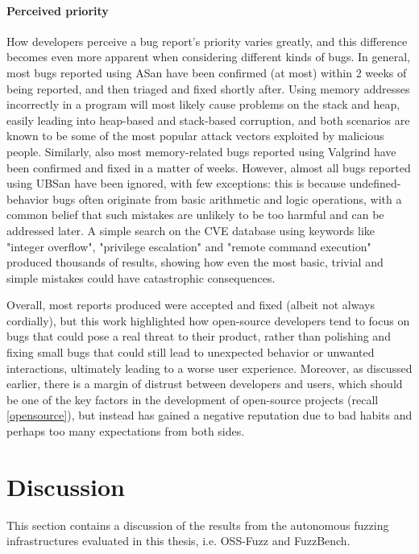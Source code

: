 \paragraph{Perceived priority} How developers perceive a bug report's priority varies greatly, and this difference becomes even more apparent when considering different kinds of bugs. In general, most bugs reported using ASan have been confirmed (at most) within 2 weeks of being reported, and then triaged and fixed shortly after. Using memory addresses incorrectly in a program will most likely cause problems on the stack and heap, easily leading into heap-based and stack-based corruption, and both scenarios are known to be some of the most popular attack vectors exploited by malicious people. Similarly, also most memory-related bugs reported using Valgrind have been confirmed and fixed in a matter of weeks. However, almost all bugs reported using UBSan have been ignored, with few exceptions: this is because undefined-behavior bugs often originate from basic arithmetic and logic operations, with a common belief that such mistakes are unlikely to be too harmful and can be addressed later. A simple search on the CVE database \cite{cve} using keywords like "integer overflow", "privilege escalation" and "remote command execution" produced thousands of results, showing how even the most basic, trivial and simple mistakes could have catastrophic consequences.

Overall, most reports produced were accepted and fixed (albeit not always cordially), but this work highlighted how open-source developers tend to focus on bugs that could pose a real threat to their product, rather than polishing and fixing small bugs that could still lead to unexpected behavior or unwanted interactions, ultimately leading to a worse user experience. Moreover, as discussed earlier, there is a margin of distrust between developers and users, which should be one of the key factors in the development of open-source projects (recall \ref{opensource}), but instead has gained a negative reputation due to bad habits and perhaps too many expectations from both sides.












\newpage
\section{Discussion}
This section contains a discussion of the results from the autonomous fuzzing infrastructures evaluated in this thesis, i.e. OSS-Fuzz and FuzzBench.

